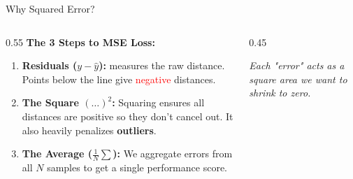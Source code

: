 \begin{frame}{Why Squared Error?}
    \begin{columns}[T]
        \begin{column}{0.55\textwidth}
            \textbf{The 3 Steps to MSE Loss:}
            
            \vspace{0.8em}
            \begin{enumerate}
                \item \textbf{Residuals ($y - \hat{y}$):} measures the raw distance. Points below the line give \textcolor{red}{negative} distances.
                \item \textbf{The Square $(\dots)^2$:} Squaring ensures all distances are positive so they don't cancel out. It also heavily penalizes \textbf{outliers}.
                \item \textbf{The Average ($\frac{1}{N} \sum$):} We aggregate errors from all $N$ samples to get a single performance score.
            \end{enumerate}
        \end{column}

        \begin{column}{0.45\textwidth}
            \centering
            \vspace{0.5em}
            \small \textit{Each "error" acts as a square area we want to shrink to zero.}
        \end{column}
    \end{columns}
\end{frame}

